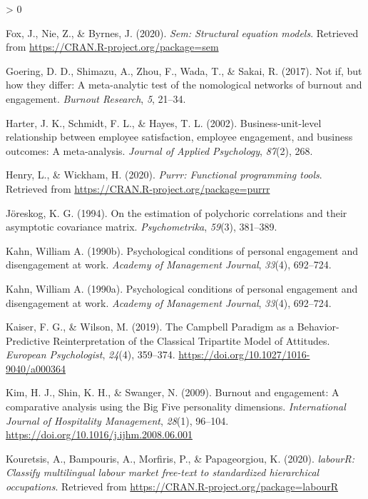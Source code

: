 \documentclass[
  english,
  man]{apa6}
\newlength{\cslhangindent}
\newenvironment{CSLReferences}[2] %
 {%
  \setlength{\parindent}{0pt}
  \ifodd #1 \everypar{\setlength{\hangindent}{\cslhangindent}}\ignorespaces\fi
  \ifnum #2 > 0
  \setlength{\parskip}{#2\baselineskip}
  \fi
 }%
 {}
\begin{document}
\begin{CSLReferences}{1}{0}
\leavevmode\hypertarget{ref-R-sem}{}%
Fox, J., Nie, Z., \& Byrnes, J. (2020). \emph{Sem: Structural equation models}. Retrieved from \url{https://CRAN.R-project.org/package=sem}

\leavevmode\hypertarget{ref-goering2017not}{}%
Goering, D. D., Shimazu, A., Zhou, F., Wada, T., \& Sakai, R. (2017). Not if, but how they differ: A meta-analytic test of the nomological networks of burnout and engagement. \emph{Burnout Research}, \emph{5}, 21--34.

\leavevmode\hypertarget{ref-harter_business-unit-level_2002}{}%
Harter, J. K., Schmidt, F. L., \& Hayes, T. L. (2002). Business-unit-level relationship between employee satisfaction, employee engagement, and business outcomes: A meta-analysis. \emph{Journal of Applied Psychology}, \emph{87}(2), 268.

\leavevmode\hypertarget{ref-R-purrr}{}%
Henry, L., \& Wickham, H. (2020). \emph{Purrr: Functional programming tools}. Retrieved from \url{https://CRAN.R-project.org/package=purrr}

\leavevmode\hypertarget{ref-joreskog1994estimation}{}%
Jöreskog, K. G. (1994). On the estimation of polychoric correlations and their asymptotic covariance matrix. \emph{Psychometrika}, \emph{59}(3), 381--389.

\leavevmode\hypertarget{ref-kahn1990psychological}{}%
Kahn, William A. (1990b). Psychological conditions of personal engagement and disengagement at work. \emph{Academy of Management Journal}, \emph{33}(4), 692--724.

\leavevmode\hypertarget{ref-kahn_psychological_1990}{}%
Kahn, William A. (1990a). Psychological conditions of personal engagement and disengagement at work. \emph{Academy of Management Journal}, \emph{33}(4), 692--724.

\leavevmode\hypertarget{ref-kaiser_campbell_2019}{}%
Kaiser, F. G., \& Wilson, M. (2019). The {Campbell} {Paradigm} as a {Behavior}-{Predictive} {Reinterpretation} of the {Classical} {Tripartite} {Model} of {Attitudes}. \emph{European Psychologist}, \emph{24}(4), 359--374. \url{https://doi.org/10.1027/1016-9040/a000364}

\leavevmode\hypertarget{ref-kim_burnout_2009}{}%
Kim, H. J., Shin, K. H., \& Swanger, N. (2009). Burnout and engagement: {A} comparative analysis using the {Big} {Five} personality dimensions. \emph{International Journal of Hospitality Management}, \emph{28}(1), 96--104. \url{https://doi.org/10.1016/j.ijhm.2008.06.001}

\leavevmode\hypertarget{ref-R-labourR}{}%
Kouretsis, A., Bampouris, A., Morfiris, P., \& Papageorgiou, K. (2020). \emph{labourR: Classify multilingual labour market free-text to standardized hierarchical occupations}. Retrieved from \url{https://CRAN.R-project.org/package=labourR}


\end{CSLReferences}
\end{document}
